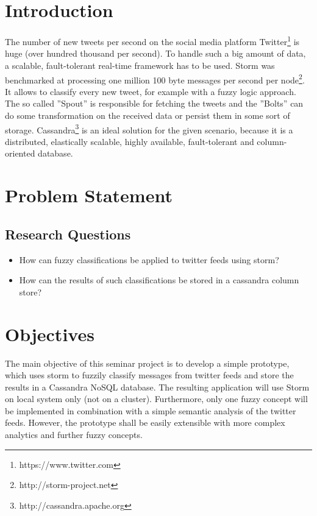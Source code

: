 \documentclass[a4paper]{article}
\begin{document}
  





\pagestyle{plain}
\newpage

\section{Introduction}

The number of new tweets per second on the social media platform Twitter\footnote{https://www.twitter.com} is huge (over hundred thousand per second). To handle such a big amount of data, a scalable, fault-tolerant real-time framework has to be used. Storm was benchmarked at processing one million 100 byte messages per second per node\footnote{http://storm-project.net}. It allows to classify every new tweet, for example with a fuzzy logic approach. The so called ''Spout'' is responsible for fetching the tweets and the ''Bolts'' can do some transformation on the received data or persist them in some sort of storage. Cassandra\footnote{http://cassandra.apache.org} is an ideal solution for the given scenario, because it is a distributed, elastically scalable, highly available, fault-tolerant and column-oriented database.

\section{Problem Statement}

\subsection{Research Questions}
\vspace{0.5cm}
\begin{itemize}
\item How can fuzzy classifications be applied to twitter feeds using storm?
\item How can the results of such classifications be stored in a cassandra column store?
\end{itemize}



\section{Objectives}

The main objective of this seminar project is to develop a simple prototype, which uses storm to fuzzily classify messages from twitter feeds and store the results in a Cassandra NoSQL database.
The resulting application will use Storm on local system only (not on a cluster). Furthermore, only one fuzzy concept will be implemented in combination with a simple semantic analysis of the twitter feeds. However, the prototype shall be easily extensible with more complex analytics and further fuzzy concepts.
\end{document}
